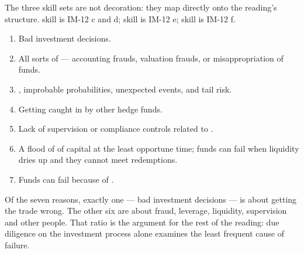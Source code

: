 \begin{imkeybox}
The three skill sets are not decoration: they map directly onto the reading's
structure.  skill is IM-12 c and d;  skill is
IM-12 e;  skill is IM-12 f.
\end{imkeybox}


\begin{enumerate}[label=\alph*)]
\item Bad investment decisions.
\item All sorts of  --- accounting frauds, valuation frauds, or
misappropriation of funds.
\item {}, improbable probabilities, unexpected events, and
tail risk.
\item Getting caught in  by other hedge funds.
\item Lack of supervision or compliance controls related to .
\item A flood of  of capital at the least
opportune time; funds can fail when liquidity dries up and they cannot meet
redemptions.
\item Funds can fail because of .
\end{enumerate}

\begin{imtrapbox}[breakable=false,title={Only the first is about being wrong}]
Of the seven reasons, exactly one --- bad investment decisions --- is about
getting the trade wrong. The other six are about fraud, leverage, liquidity,
supervision and other people. That ratio is the argument for the rest of the
reading: due diligence on the investment process alone examines the least
frequent cause of failure.
\end{imtrapbox}


